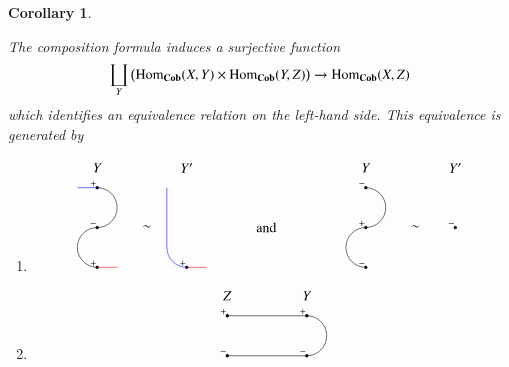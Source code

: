 \documentclass{amsart}
\def\tn{\textnormal}
\def\Hom{\tn{Hom}}
\def\to{\rightarrow}
\def\Cob{{\bf Cob}}
\newtheorem{corollary}[subsection]{Corollary}
\theoremstyle{remark}
\theoremstyle{definition}
\begin{document}
\begin{corollary}\label{cor:equivalences}

The composition formula induces a surjective function
$$\coprod_Y \big(\Hom_\Cob(X,Y)\times\Hom_\Cob(Y,Z)\big)\to\Hom_\Cob(X,Z)$$
which identifies an equivalence relation on the left-hand side. This equivalence is generated by
\begin{enumerate}
\item[(E1).]
\begin{equation*}
 \begin{tikzpicture}
  \node at (-4.25,1.5) {$Y$};
  \draw[fill=black] (-4.25,1) circle (1pt);
  \node at (-4.35,1.1) {$\scriptstyle+$};
  \draw[fill=black] (-4.25,0) circle (1pt);
  \node at (-4.35,0.1) {$\scriptstyle-$};
  \draw[fill=black] (-4.25,-1) circle (1pt);
  \node at (-4.35,-0.9) {$\scriptstyle+$};
  \draw [blue](-4.75,1) -- (-4.25,1);
  \draw (-4.25,1) arc (90:-90:0.5);
  \draw (-4.25,0) arc (90:270:0.5);
  \draw [red](-4.25,-1) -- (-3.75,-1);
  \node at (-3,0) {$\sim$};
  \node at (-2,1.5) {$Y'$};
  \draw[fill=black] (-2,-1) circle (1pt);
  \node at (-2.1,-.9) {$\scriptstyle+$};
  \draw [blue] (-2.5,1) --(-2.5,-.5); 
  \draw [blue] (-2.5,-.5) arc (-180:-90:0.5);
  \draw [red] (-2,-1) -- (-1.5,-1);
  \node at (0,0) {and};
  \node at (2.5,1.5) {$Y$};
  \draw[fill=black] (2.5,1) circle (1pt);
  \node at (2.4,1.1) {$\scriptstyle-$};
  \draw[fill=black] (2.5,0) circle (1pt);
  \node at (2.4,0.1) {$\scriptstyle+$};
  \draw[fill=black] (2.5,-1) circle (1pt);
  \node at (2.4,-0.9) {$\scriptstyle-$};
  \draw (2.5,1) arc (90:-90:0.5);
  \draw (2.5,0) arc (90:270:0.5);
  \node at (3.75,0) {$\sim$};
  \node at (4.75,1.5) {$Y'$};
  \draw[fill=black] (4.75,0) circle (1pt);
  \node at (4.65,0.1) {$\scriptstyle-$};
 \end{tikzpicture}
\end{equation*}
\item[(E2).] 
\begin{equation*}
 \begin{tikzpicture}
  \node at (-3.25,1) {$Z$};
  \draw[fill=black] (-3.25,0.5) circle (1pt);
  \node at (-3.35,0.6) {$\scriptstyle+$};
  \draw[fill=black] (-3.25,-0.5) circle (1pt);
  \node at (-3.35,-0.4) {$\scriptstyle-$};
  \node at (-1.25,1) {$Y$};
  \draw[fill=black] (-1.25,0.5) circle (1pt);
  \node at (-1.35,0.6) {$\scriptstyle+$};
  \draw[fill=black] (-1.25,-0.5) circle (1pt);
  \node at (-1.35,-0.4) {$\scriptstyle-$};
  \draw (-1.25,0.5) arc (90:-90:0.5);
  \draw (-3.25,0.5) -- (-1.25,0.5);
  \draw (-3.25,-0.5) -- (-1.25,-0.5);

\end{tikzpicture}
\end{equation*}
\end{enumerate}
\end{corollary}
\end{document}
